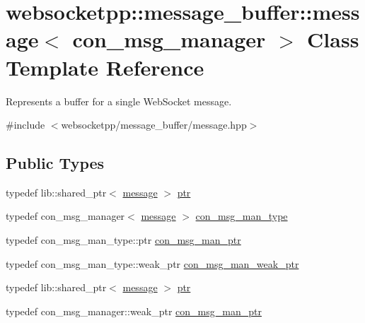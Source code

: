 \hypertarget{classwebsocketpp_1_1message__buffer_1_1message}{}\section{websocketpp\+:\+:message\+\_\+buffer\+:\+:message$<$ con\+\_\+msg\+\_\+manager $>$ Class Template Reference}
\label{classwebsocketpp_1_1message__buffer_1_1message}


Represents a buffer for a single Web\+Socket message.  




{\ttfamily \#include $<$websocketpp/message\+\_\+buffer/message.\+hpp$>$}

\subsection*{Public Types}
\begin{DoxyCompactItemize}
\item 
typedef lib\+::shared\+\_\+ptr$<$ \hyperlink{classwebsocketpp_1_1message__buffer_1_1message}{message} $>$ \hyperlink{classwebsocketpp_1_1message__buffer_1_1message_adb52b5feb820ec7bc6140cc8be9edd57}{ptr}
\item 
typedef con\+\_\+msg\+\_\+manager$<$ \hyperlink{classwebsocketpp_1_1message__buffer_1_1message}{message} $>$ \hyperlink{classwebsocketpp_1_1message__buffer_1_1message_a30657669d087f13475246f946d6b6361}{con\+\_\+msg\+\_\+man\+\_\+type}
\item 
typedef con\+\_\+msg\+\_\+man\+\_\+type\+::ptr \hyperlink{classwebsocketpp_1_1message__buffer_1_1message_abb7a33ceab94975c7503102537c33b48}{con\+\_\+msg\+\_\+man\+\_\+ptr}
\item 
typedef con\+\_\+msg\+\_\+man\+\_\+type\+::weak\+\_\+ptr \hyperlink{classwebsocketpp_1_1message__buffer_1_1message_a54e04850b167306ef4e04ac2612e5c18}{con\+\_\+msg\+\_\+man\+\_\+weak\+\_\+ptr}
\item 
typedef lib\+::shared\+\_\+ptr$<$ \hyperlink{classwebsocketpp_1_1message__buffer_1_1message}{message} $>$ \hyperlink{classwebsocketpp_1_1message__buffer_1_1message_adb52b5feb820ec7bc6140cc8be9edd57}{ptr}
\item 
typedef con\+\_\+msg\+\_\+manager\+::weak\+\_\+ptr \hyperlink{classwebsocketpp_1_1message__buffer_1_1message_a7fff9a702f65dc3f1b75058664833db5}{con\+\_\+msg\+\_\+man\+\_\+ptr}
\end{DoxyCompactItemize}
